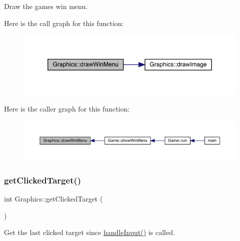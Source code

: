Draw the game\textquotesingle{}s win menu. 

Here is the call graph for this function\+:\nopagebreak
\begin{figure}[H]
\begin{center}
\leavevmode
\includegraphics[width=350pt]{class_graphics_ae8619c9c1de576df13861512024d7867_cgraph}
\end{center}
\end{figure}
Here is the caller graph for this function\+:
\nopagebreak
\begin{figure}[H]
\begin{center}
\leavevmode
\includegraphics[width=350pt]{class_graphics_ae8619c9c1de576df13861512024d7867_icgraph}
\end{center}
\end{figure}
\mbox{\label{class_graphics_a53c02790c4103525e542982175f1addb}} 
\subsubsection{\texorpdfstring{get\+Clicked\+Target()}{getClickedTarget()}}
{\footnotesize\ttfamily int Graphics\+::get\+Clicked\+Target (\begin{DoxyParamCaption}{ }\end{DoxyParamCaption})}



Get the last clicked target since \mbox{\hyperlink{class_graphics_adff993cdcd0ed498c82cf7be87ead4f1}{handle\+Input()}} is called. 

